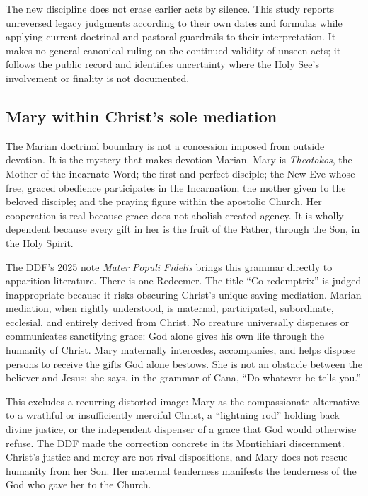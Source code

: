 The new discipline does not erase earlier acts by silence. This study reports unreversed legacy judgments according to their own dates and formulas while applying current doctrinal and pastoral guardrails to their interpretation. It makes no general canonical ruling on the continued validity of unseen acts; it follows the public record and identifies uncertainty where the Holy See's involvement or finality is not documented.

\subsection{Mary within Christ's sole mediation}

The Marian doctrinal boundary is not a concession imposed from outside devotion. It is the mystery that makes devotion Marian. Mary is \emph{Theotokos}, the Mother of the incarnate Word; the first and perfect disciple; the New Eve whose free, graced obedience participates in the Incarnation; the mother given to the beloved disciple; and the praying figure within the apostolic Church. Her cooperation is real because grace does not abolish created agency. It is wholly dependent because every gift in her is the fruit of the Father, through the Son, in the Holy Spirit.

The DDF's 2025 note \emph{Mater Populi Fidelis} brings this grammar directly to apparition literature. There is one Redeemer. The title ``Co-redemptrix'' is judged inappropriate because it risks obscuring Christ's unique saving mediation. Marian mediation, when rightly understood, is maternal, participated, subordinate, ecclesial, and entirely derived from Christ. No creature universally dispenses or communicates sanctifying grace: God alone gives his own life through the humanity of Christ. Mary maternally intercedes, accompanies, and helps dispose persons to receive the gifts God alone bestows. She is not an obstacle between the believer and Jesus; she says, in the grammar of Cana, ``Do whatever he tells you.''

This excludes a recurring distorted image: Mary as the compassionate alternative to a wrathful or insufficiently merciful Christ, a ``lightning rod'' holding back divine justice, or the independent dispenser of a grace that God would otherwise refuse. The DDF made the correction concrete in its Montichiari discernment. Christ's justice and mercy are not rival dispositions, and Mary does not rescue humanity from her Son. Her maternal tenderness manifests the tenderness of the God who gave her to the Church.


